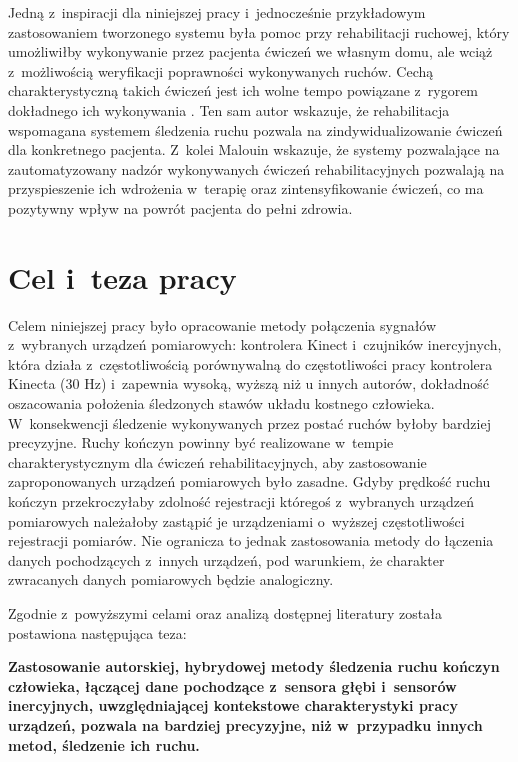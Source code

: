 Jedną z~inspiracji dla niniejszej pracy i~jednocześnie przykładowym zastosowaniem tworzonego systemu była pomoc przy rehabilitacji ruchowej, który umożliwiłby wykonywanie przez pacjenta ćwiczeń we własnym domu, ale wciąż z~możliwością weryfikacji poprawności wykonywanych ruchów. Cechą charakterystyczną takich ćwiczeń jest ich wolne tempo powiązane z~rygorem dokładnego ich wykonywania \cite{Reinkensmeyer2012}. Ten sam autor wskazuje, że rehabilitacja wspomagana systemem śledzenia ruchu pozwala na zindywidualizowanie ćwiczeń dla konkretnego pacjenta. Z~kolei Malouin \cite{Malouin2003} wskazuje, że systemy pozwalające na zautomatyzowany nadzór wykonywanych ćwiczeń rehabilitacyjnych pozwalają na przyspieszenie ich wdrożenia w~terapię oraz zintensyfikowanie ćwiczeń, co ma pozytywny wpływ na powrót pacjenta do pełni zdrowia.

\section{Cel i~teza pracy}
Celem niniejszej pracy było opracowanie metody połączenia sygnałów z~wybranych urządzeń pomiarowych: kontrolera Kinect i~czujników inercyjnych, która działa z~częstotliwością porównywalną do częstotliwości pracy kontrolera Kinecta (30 Hz) i~zapewnia wysoką, wyższą niż u innych autorów, dokładność oszacowania położenia śledzonych stawów układu kostnego człowieka. W~konsekwencji śledzenie wykonywanych przez postać ruchów byłoby bardziej precyzyjne. Ruchy kończyn powinny być realizowane w~tempie charakterystycznym dla ćwiczeń rehabilitacyjnych, aby zastosowanie zaproponowanych urządzeń pomiarowych było zasadne. Gdyby prędkość ruchu kończyn przekroczyłaby zdolność rejestracji któregoś z~wybranych urządzeń pomiarowych należałoby zastąpić je urządzeniami o~wyższej częstotliwości rejestracji pomiarów. Nie ogranicza to jednak zastosowania metody do łączenia danych pochodzących z~innych urządzeń, pod warunkiem, że charakter zwracanych danych pomiarowych będzie analogiczny. 

Zgodnie z~powyższymi celami oraz analizą dostępnej literatury została postawiona następująca teza:\\
\begin{center}
	\textbf{Zastosowanie autorskiej, hybrydowej metody śledzenia ruchu kończyn człowieka, łączącej dane pochodzące z~sensora głębi i~sensorów inercyjnych, uwzględniającej kontekstowe charakterystyki pracy urządzeń, pozwala na bardziej precyzyjne, niż w~przypadku innych metod, śledzenie ich ruchu.}
\end{center}

